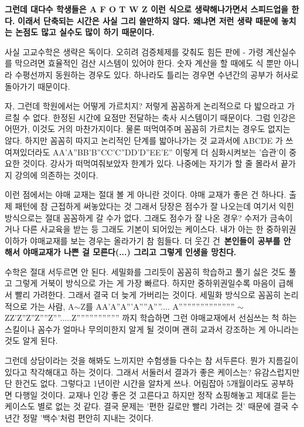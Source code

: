 \textbf{그런데 대다수 학생들은 A F O T W Z 이런 식으로 생략해나가면서 스피드업을 한다.}
\textbf{이래서 단축되는 시간은 사실 그리 쓸만하지 않다. 왜냐면 저런 생략 때문에 놓치는 논점도 많고 실수도 많이 하기 때문이다.}
\vspace{5mm}

사실 고교수학은 생략은 독이다. 오히려 검증체제를 갖춰도 힘든 판에 -
가령 계산실수를 막으려면 효율적인 검산 시스템이 있어야 한다. 숫자 계산을 할 때에도 식 뿐만 아니라 수평선까지 동원하는 경우도 있다.
하나라도 틀리는 경우면 수년간의 공부가 허사로 돌아가기 때문이다.
\vspace{5mm}

자, 그런데 학원에서는 어떻게 가르치지? 저렇게 꼼꼼하게 논리적으로 다 밟으라고 가르칠 수 없다.
한정된 시간에 요점만 전달하는 축사 시스템이기 때문이다.
그럼 인강은 어떤가, 이것도 거의 마찬가지이다. 물론 떠먹여주며 꼼꼼히 가르치는 경우도 없지는 않다.
하지만 꼼꼼히 따지고 논리적인 단계를 밟아나가는 것
교과서에 ABCDE 가 쓰여져있더라도 AA'A''BB'B''CC'C''DD'D''EE'E'' 이렇게 더 심화시켜보는 '습관'이 중요한 것이다.
강사가 떠먹여줘보았자 한계가 있다. 나중에는 자기가 할 줄 몰라서 끝가지 강의에 의존하는 것이다.
\vspace{5mm}

이런 점에서는 야매 교재는 절대 볼 게 아니란 것이다.
야매 교재가 좋은 건 하나다. 출제 패턴에 참 근접하게 써놓았다는 것
그래서 당장은 점수가 잘 나오는데 여기서 익힌 방식으로는 절대 꼼꼼하게 갈 수가 없다.
그래도 점수가 잘 나온 경우? 수저가 금속이거나 다른 사교육을 받는 등 그래도 기본이 되어있는 케이스다.
내가 아는 한 중하위권 이하가 야매교재를 보는 경우는 올라가기 참 힘들다.
더 웃긴 건 \textbf{본인들이 공부를 안 해서 야매교재가 나쁜 걸 모른다(...) 그리고 그렇게 인생을 망친다.}
\vspace{5mm}

수학은 절대 서두르면 안 된다. 세밀화를 그리듯이 꼼꼼히 학습하고 풀기 싫은 것도 풀고 그렇게 거북이 방식으로 가는 게 가장 빠르다.
하지만 중하위권일수록 마음이 급해서 빨리 가려한다. 그래서 결국 더 늦게 가버리는 것이다.
세밀화 방식으로 꼼꼼히 논리적으로 가는 사람, A$\sim$Z를 AA'A''A'''A''''A''''.... A'''''''''''''''''''''''''' $\sim$ ZZ'Z''Z''Z''''Z''''.....Z'''''''''''''''''''' 까지 학습하면
그런 야매교재에서 선심쓰는 척 하는 스킬이나 꼼수가 얼마나 무의미한지 알게 될 것이며
괜히 교과서 강조하는 게 아니라는 것도 알게 된다.
\vspace{5mm}

그런데 상담이라는 것을 해봐도 느끼지만 수험생들 다수는 참 서두른다. 뭔가 지름길이 있다고 착각해대고 하는 것이다.
그래서 서둘러서 결과가 좋은 케이스는? 유감스럽지만 단 한건도 없다.
그렇다고 1년이란 시간을 알차게 쓰나. 어림잡아 5개월이라도 공부하면 다행일 것이다.
교재나 인강 좋은 것 고른다고 하지만 정작 쇼핑해놓고 제대로 듣는 케이스도 별로 없는 것 같다.
결국 문제는 '편한 길로만 빨리 가려는 것' 때문에 결국 수년간 정말 '백수'처럼 편안히 지내는 것이다.
\vspace{5mm}

